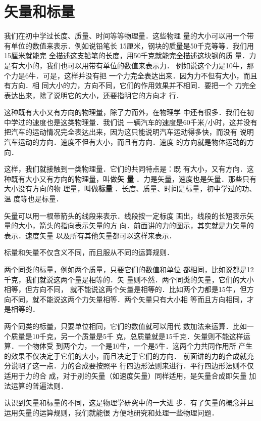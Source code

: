 \section{矢量和标量} 
    我们在初中学过长度、质量、时间等等物理量．这些物理
量的大小可以用一个带有单位的数值来表示．例如说铅笔长
15厘米，钢块的质量是50千克等等．我们用15厘米就能完
全描述这支铅笔的长度，用50千克就能完全描述这块钢的质
量．力是有大小的，我们也可以用带有单位的数值来表示力．
例如说这个力是10牛，那个力是6牛．可是，这样并没有把
一个力完全表达出来．因为力不但有大小，而且有方向．相
同大小的力，方向不同，它们的作用效果并不相同．要把一个
力完全表达出来，除了说明它的大小，还要指明它的方向才
行．

    这种既有大小又有方向的物理量，除了力而外，在物理学
中还有很多．我们在初中学过的速度也是这类物理量．我们说
一辆汽车的速度是60千米/小时，这并没有把汽车的运动情况完全表达出来，因为这只能说明汽车运动得多快，而没有
说明汽车运动的方向．速度不但有大小，而且有方向．速度
的方向就是物体运动的方向．

    这样，我们就接触到一类物理量．它们的共同特点是：既
有大小，又有方向．这种既有大小又有方向的物理量，叫做\textbf{矢
量} ．力是矢量，速度也是矢量．那些只有大小没有方向的物
理量，叫做\textbf{标量} ．长度、质量、时间是标量，初中学过的功、温
度等也是标量．

    矢量可以用一根带箭头的线段来表示．线段按一定标度
画出，线段的长短表示矢量的大小，箭头的指向表示矢量的方
向．前面讲的力的图示，其实就是力矢量的表示．速度矢量
以及所有其他矢量都可以这样来表示．

    标量和矢量不仅含义不同，而且服从不同的运算规则．

    两个同类的标量，例如两个质量，只要它们的数值和单位
都相同，比如说都是12千克，我们就说这两个量是相等的．矢
量则不然．两个同类的矢量，它们的大小相等，但方向不同，
就不能说这两个矢量是相等的．比如两个力都是15牛，但方
向不同，就不能说这两个力矢量相等．两个矢量只有大小相
等而且方向相同，才是相等的．

    两个同类的标量，只要单位相同，它们的数值就可以用代
数加法来运算．比如一个质量是10千克，另一个质量是5千
克，总质量就是15千克．矢量则不能这样运算．一个物体受
到两个力，一个是10牛，一个是5牛．这两个力共同作用所
产生的效果不仅决定于它们的大小，而且决定于它们的方向．
前面讲的力的合成就充分说明了这一点．力的合成要按照平
行四边形法则来进行．平行四边形法则不仅适用于力的合
成，对于别的矢量（如速度矢量）同样适用，是矢量合成即矢量
加法运算的普遍法则．

    认识到矢量和标量的不同，这是物理学研究中的一大进
步．有了矢量的概念并且运用矢量的运算规则，我们就能很
方便地研究和处理一些物理问题．

